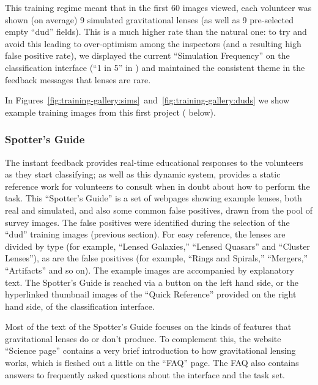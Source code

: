 \documentclass[useAMS,usenatbib,a4paper]{mn2e}
\begin{document}
This training regime meant that in the first 60 images viewed, each volunteer
was shown (on average) 9 simulated gravitational lenses (as well as 9
pre-selected empty ``dud'' fields). This is a much higher rate than the natural
one: to try and avoid this leading to over-optimism among the inspectors (and a
resulting high false positive rate), we displayed the current ``Simulation
Frequency'' on the classification interface (``1 in 5'' in
) and maintained the consistent theme in the feedback
messages that lenses are rare.

In Figures~\ref{fig:training-gallery:sims}~and~\ref{fig:training-gallery:duds}
we show example training images from this first \SW project (
below).


\subsubsection{Spotter's Guide}
\label{sec:design:training:guide}

The instant feedback provides real-time educational responses to the volunteers
as they start classifying; as well as this dynamic system, \SW provides a static
reference work for volunteers to consult when in doubt about how to perform the
task. This ``Spotter's Guide'' is a set of webpages showing example lenses, both
real and simulated, and also some common false positives, drawn from the pool of
survey images. The false positives were identified during the selection of the
``dud'' training images (previous section). For easy reference, the lenses are
divided by type (for example, ``Lensed Galaxies,'' ``Lensed Quasars'' and
``Cluster Lenses''), as are the false positives (for example, ``Rings and
Spirals,'' ``Mergers,'' ``Artifacts'' and so on). The example images are
accompanied by explanatory text. The Spotter's Guide is reached via a button on
the left hand side, or the hyperlinked thumbnail images of the ``Quick
Reference'' provided on the right hand side, of the classification interface.

Most of the text of the Spotter's Guide focuses on the kinds of features that
gravitational lenses do or don't produce. To complement this,
the website ``Science page'' contains a very brief introduction to how
gravitational lensing works, which is fleshed out a little on the ``FAQ'' page.
The FAQ also contains answers to frequently asked questions about the interface
and the task set.

\end{document}
